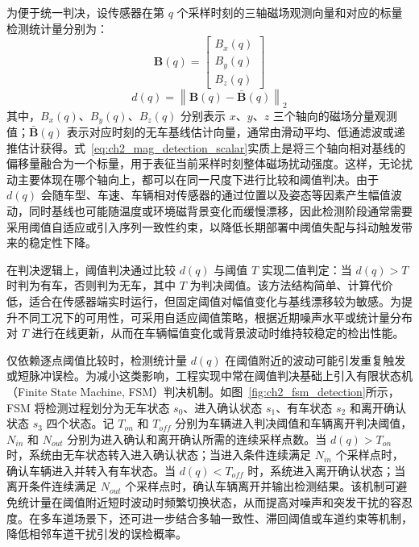 \documentclass{xdupgthesis}
\begin{document}
为便于统一判决，设传感器在第 $q$ 个采样时刻的三轴磁场观测向量和对应的标量检测统计量分别为：
\begin{equation}
	\mathbf{B}(q)=
	\begin{bmatrix}
		B_x(q)\\
		B_y(q)\\
		B_z(q)
	\end{bmatrix}
	\label{eq:ch2_mag_observation_vector}
\end{equation}
\begin{equation}
	d(q)=\left\lVert \mathbf{B}(q)-\bar{\mathbf{B}}(q)\right\rVert_2
	\label{eq:ch2_mag_detection_scalar}
\end{equation}
其中，$B_x(q)$、$B_y(q)$、$B_z(q)$ 分别表示 $x$、$y$、$z$ 三个轴向的磁场分量观测值；$\bar{\mathbf{B}}(q)$ 表示对应时刻的无车基线估计向量，通常由滑动平均、低通滤波或递推估计获得。式~\eqref{eq:ch2_mag_detection_scalar}实质上是将三个轴向相对基线的偏移量融合为一个标量，用于表征当前采样时刻整体磁场扰动强度。这样，无论扰动主要体现在哪个轴向上，都可以在同一尺度下进行比较和阈值判决。由于 $d(q)$ 会随车型、车速、车辆相对传感器的通过位置以及姿态等因素产生幅值波动，同时基线也可能随温度或环境磁背景变化而缓慢漂移，因此检测阶段通常需要采用阈值自适应或引入序列一致性约束，以降低长期部署中阈值失配与抖动触发带来的稳定性下降\cite{sarcevic2022singlemagnetometer}。

在判决逻辑上，阈值判决通过比较 $d(q)$ 与阈值 $T$ 实现二值判定：当 $d(q)>T$ 时判为有车，否则判为无车，其中 $T$ 为判决阈值。该方法结构简单、计算代价低，适合在传感器端实时运行，但固定阈值对幅值变化与基线漂移较为敏感。为提升不同工况下的可用性，可采用自适应阈值策略，根据近期噪声水平或统计量分布对 $T$ 进行在线更新，从而在车辆幅值变化或背景波动时维持较稳定的检出性能。

仅依赖逐点阈值比较时，检测统计量 \(d(q)\) 在阈值附近的波动可能引发重复触发或短脉冲误检。为减小这类影响，工程实现中常在阈值判决基础上引入有限状态机（Finite State Machine, FSM）判决机制。如图~\ref{fig:ch2_fsm_detection}所示，FSM 将检测过程划分为无车状态 \(s_0\)、进入确认状态 \(s_1\)、有车状态 \(s_2\) 和离开确认状态 \(s_3\) 四个状态。记 \(T_{on}\) 和 \(T_{off}\) 分别为车辆进入判决阈值和车辆离开判决阈值，\(N_{in}\) 和 \(N_{out}\) 分别为进入确认和离开确认所需的连续采样点数。当 \(d(q)>T_{on}\) 时，系统由无车状态转入进入确认状态；当进入条件连续满足 \(N_{in}\) 个采样点时，确认车辆进入并转入有车状态。当 \(d(q)<T_{off}\) 时，系统进入离开确认状态；当离开条件连续满足 \(N_{out}\) 个采样点时，确认车辆离开并输出检测结果。该机制可避免统计量在阈值附近短时波动时频繁切换状态，从而提高对噪声和突发干扰的容忍度。在多车道场景下，还可进一步结合多轴一致性、滞回阈值或车道约束等机制，降低相邻车道干扰引发的误检概率\cite{guilbert2016statemachine}。
\end{document}
